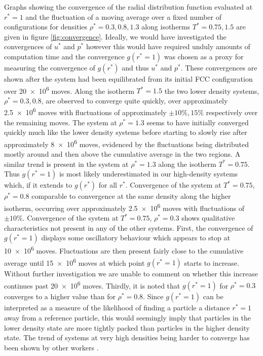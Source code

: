 \documentclass[10pt, twocolumn]{revtex4}    %
\begin{document}
Graphs showing the convergence of the radial distribution function evaluated at $r^{*}=1$ and the fluctuation of a moving average over a fixed number of configurations for densities $\rho{}^{*}=0.3, 0.8, 1.3$ along isotherms $T^{*} = 0.75, 1.5$ are given in figure \ref{fig:convergence}. Ideally, we would have investigated the convergences of $u^{*}$ and $p^{*}$ however this would have required unduly amounts of computation time and the convergence $g(r^{*}=1)$ was chosen as a proxy for measuring the convergence of $g(r^{*})$ and thus $u^{*}$ and $p^{*}$.
These convergences are shown after the system had been equilibrated from its initial FCC configuration over \num{20e6} moves.
Along the isotherm $T^{*}=1.5$ the two lower density systems, $\rho{}^{*}=0.3, 0.8$, are observed to converge quite quickly, over approximately \num{2.5e6} moves with fluctuations of approximately $\pm{}10\%, 15\%$ respectively over the remaining moves. The system at $\rho{}^{*}=1.3$ seems to have initially converged quickly much like the lower density systems before starting to slowly rise after approximately \num{8e6} moves, evidenced by the fluctuations being distributed mostly around and then above the cumulative average in the two regions.
A similar trend is present in the system at $\rho{}^{*}=1.3$ along the isotherm $T^{*}=0.75$. Thus $g(r^{*}=1)$ is most likely underestimated in our high-density systems which, if it extends to $g(r^{*})$ for all $r^{*}$.
Convergence of the system at $T^{*}=0.75$, $\rho{}^{*}=0.8$ comparable to convergence at the same density along the higher isotherm, occurring over approximately \num{2.5e6} moves with fluctuations of $\pm{}10\%$.
Convergence of the system at $T^{*}=0.75$, $\rho{}^{*}=0.3$ shows qualitative characteristics not present in any of the other systems. First, the convergence of $g(r^{*}=1)$ displays some oscillatory behaviour which appears to stop at \num{10e6} moves. Fluctuations are then present fairly close to the cumulative average until \num{15e6} moves at which point $g(r^{*}=1)$ starts to increase. Without further investigation we are unable to comment on whether this increase continues past \num{20e6} moves. Thirdly, it is noted that $g(r^{*}=1)$ for $\rho{}^{*}=0.3$ converges to a higher value than for $\rho{}^{*}=0.8$. Since $g(r^{*}=1)$ can be interpreted as a measure of the likelihood of finding a particle a distance $r^{*}=1$ away from a reference particle, this would seemingly imply that particles in the lower density state are more tightly packed than particles in the higher density state.
The trend of systems at very high densities being harder to converge has been shown by other workers \cite{WoodParker}.
\end{document}
